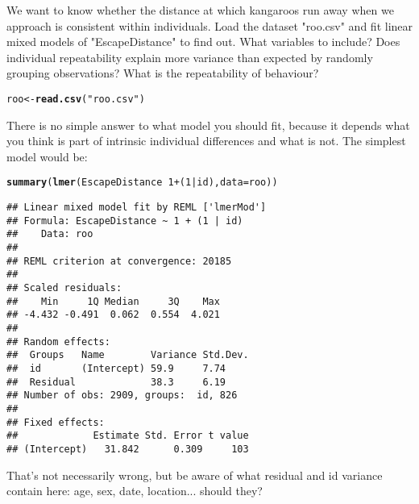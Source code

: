 \documentclass[12pt,a4paper]{scrartcl}\usepackage[]{graphicx}\usepackage[]{color}
\makeatletter
\newcommand{\hlnum}[1]{\textcolor[rgb]{0.686,0.059,0.569}{#1}}%
\newcommand{\hlstr}[1]{\textcolor[rgb]{0.192,0.494,0.8}{#1}}%
\newcommand{\hlopt}[1]{\textcolor[rgb]{0,0,0}{#1}}%
\newcommand{\hlstd}[1]{\textcolor[rgb]{0.345,0.345,0.345}{#1}}%
\newcommand{\hlkwb}[1]{\textcolor[rgb]{0.69,0.353,0.396}{#1}}%
\newcommand{\hlkwc}[1]{\textcolor[rgb]{0.333,0.667,0.333}{#1}}%
\newcommand{\hlkwd}[1]{\textcolor[rgb]{0.737,0.353,0.396}{\textbf{#1}}}%
\newenvironment{kframe}{%
 \def\at@end@of@kframe{}%
 \ifinner\ifhmode%
  \def\at@end@of@kframe{\end{minipage}}%
  \begin{minipage}{\columnwidth}%
 \fi\fi%
 \def\FrameCommand##1{\hskip\@totalleftmargin \hskip-\fboxsep
 \colorbox{shadecolor}{##1}\hskip-\fboxsep
     \hskip-\linewidth \hskip-\@totalleftmargin \hskip\columnwidth}%
 \MakeFramed {\advance\hsize-\width
   \@totalleftmargin\z@ \linewidth\hsize
   \@setminipage}}%
 {\par\unskip\endMakeFramed%
 \at@end@of@kframe}
\newenvironment{knitrout}{}{} %
\makeatother
\begin{document}
\begin{Exercise}[difficulty=3, title={Do kangaroos have personalities?}]

We want to know whether the distance at which kangaroos run away when we approach is consistent within individuals. Load the dataset "roo.csv" and fit linear mixed models of "EscapeDistance" to find out. What variables to include? Does individual repeatability explain more variance than expected by randomly grouping observations? What is the repeatability of behaviour?
\end{Exercise}
\begin{Answer}
\begin{knitrout}
\color{fgcolor}\begin{kframe}
\begin{alltt}
\hlstd{roo} \hlkwb{<-} \hlkwd{read.csv}\hlstd{(}\hlstr{"roo.csv"}\hlstd{)}
\end{alltt}
\end{kframe}
\end{knitrout}

There is no simple answer to what model you should fit, because it depends what you think is part of intrinsic individual differences and what is not. The simplest model would be:
\begin{knitrout}
\color{fgcolor}\begin{kframe}
\begin{alltt}
\hlkwd{summary}\hlstd{(}\hlkwd{lmer}\hlstd{(EscapeDistance} \hlopt{~} \hlnum{1} \hlopt{+} \hlstd{(}\hlnum{1}\hlopt{|}\hlstd{id),} \hlkwc{data}\hlstd{=roo))}
\end{alltt}
\begin{verbatim}
## Linear mixed model fit by REML ['lmerMod']
## Formula: EscapeDistance ~ 1 + (1 | id)
##    Data: roo
## 
## REML criterion at convergence: 20185
## 
## Scaled residuals: 
##    Min     1Q Median     3Q    Max 
## -4.432 -0.491  0.062  0.554  4.021 
## 
## Random effects:
##  Groups   Name        Variance Std.Dev.
##  id       (Intercept) 59.9     7.74    
##  Residual             38.3     6.19    
## Number of obs: 2909, groups:  id, 826
## 
## Fixed effects:
##             Estimate Std. Error t value
## (Intercept)   31.842      0.309     103
\end{verbatim}
\end{kframe}
\end{knitrout}
That's not necessarily wrong, but be aware of what residual and id variance contain here: age, sex, date, location... should they?


\end{Answer}
\end{document}
